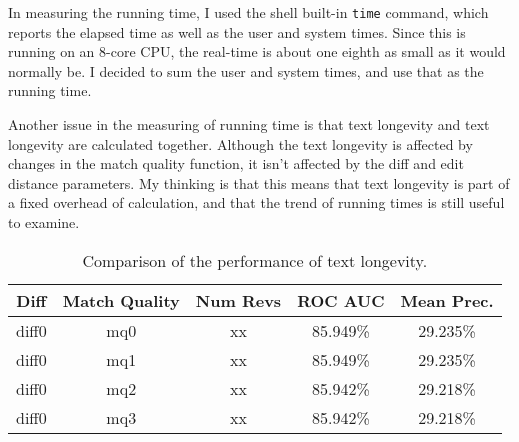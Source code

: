In measuring the running time, I used the shell built-in
\texttt{time} command, which reports the elapsed time as well
as the user and system times.
Since this is running on an 8-core CPU, the real-time is about
one eighth as small as it would normally be.
I decided to sum the user and system times, and use that as
the running time.

Another issue in the measuring of running time is that
text longevity and text longevity are calculated together.
Although the text longevity is affected by changes in the
match quality function, it isn't affected by the diff and
edit distance parameters.
My thinking is that this means that text longevity is part
of a fixed overhead of calculation, and that the trend
of running times is still useful to examine.

\begin{table}[tbph]
\begin{center}
\begin{tabular}{|c|c||c|c|c|}
\hline
Diff & Match Quality & Num Revs & ROC AUC & Mean Prec. \\
\hline
\hline
diff0 & mq0 & xx & 85.949\% & 29.235\% \\
diff0 & mq1 & xx & 85.949\% & 29.235\% \\
diff0 & mq2 & xx & 85.942\% & 29.218\% \\
diff0 & mq3 & xx & 85.942\% & 29.218\% \\
\hline
\end{tabular}
\end{center}
\caption{Comparison of the performance of text longevity.
}
\end{table}



